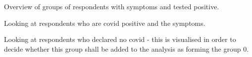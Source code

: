 \documentclass[
]{article}
\begin{document}
\hypertarget{htmlwidget-0cb2c06cc2dabc5d95a8}{}
\begin{plotly}

\end{plotly}

\hypertarget{htmlwidget-add28e73bbe5733dc9a8}{}
\begin{plotly}

\end{plotly}

\hypertarget{htmlwidget-50bba5cef10f8a842f58}{}
\begin{plotly}

\end{plotly}

Overview of groups of respondents with symptoms and tested positive.

Looking at respondents who are covid positive and the symptoms.

\hypertarget{htmlwidget-9fcbbf8f0ede2e0976be}{}
\begin{plotly}

\end{plotly}

Looking at respondents who declared no covid - this is visualised in
order to decide whether this group shall be added to the analysis as
forming the group 0.

\hypertarget{htmlwidget-31950989922c4f93d372}{}
\begin{plotly}

\end{plotly}

\hypertarget{htmlwidget-600a3309a17c017e67a5}{}
\begin{plotly}

\end{plotly}
\end{document}
